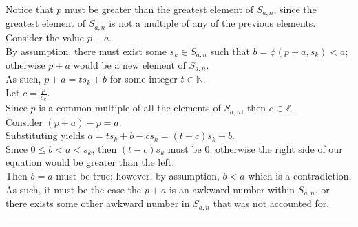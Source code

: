 \documentclass[a4paper,12pt]{article}
\begin{document}
\noindent Notice that $p$ must be greater than the greatest element of $S_{a,n}$, since the greatest element of $S_{a, n}$ is not a multiple of any of the previous elements.\\

\noindent Consider the value $p + a$.\\

\noindent By assumption, there must exist some $s_k \in S_{a,n}$ such that $b = \phi(p + a, s_k) < a$; otherwise $p + a$ would be a new element of $S_{a,n}$.\\

\noindent As such, $p + a = ts_k + b$ for some integer $t \in \mathbb{N}$.\\

\noindent Let $c = \frac{p}{s_k}$.\\

\noindent Since $p$ is a common multiple of all the elements of $S_{a,n}$, then $c \in \mathbb{Z}$.\\

\noindent Consider $(p + a) - p = a$.\\

\noindent Substituting yields $a = ts_k + b - cs_k = (t- c)s_k + b$.\\

\noindent Since $0 \leq b < a < s_k$, then $(t - c)s_k$ must be $0$; otherwise the right side of our equation would be greater than the left.\\

\noindent Then $b = a$ must be true; however, by assumption, $b < a$ which is a contradiction.\\

\noindent As such, it must be the case the $p + a$ is an awkward number within $S_{a,n}$, or there exists some other awkward number in $S_{a,n}$ that was not accounted for.

\begin{center}
\noindent\rule{8cm}{0.4pt}
\end{center}
\end{document}
